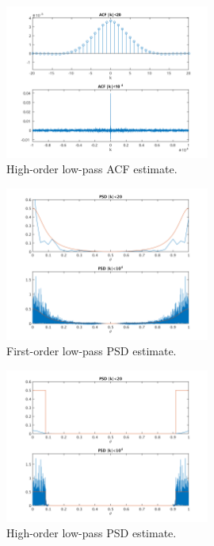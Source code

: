 \begin{figure}[!ht]
\centering
\includegraphics[width=0.6\textwidth]{bilder/Lab1/Lab1fig4.svg}
\caption{High-order low-pass ACF estimate.}
\label{fig:Lab1fig4}
\end{figure}

\begin{figure}[!ht]
\centering
\includegraphics[width=0.6\textwidth]{bilder/Lab1/Lab1fig5.svg}
\caption{First-order low-pass PSD estimate.}
\label{fig:Lab1fig5}
\end{figure}

\begin{figure}[!ht]
\centering
\includegraphics[width=0.6\textwidth]{bilder/Lab1/Lab1fig6.svg}
\caption{High-order low-pass PSD estimate.}
\label{fig:Lab1fig6}
\end{figure}

